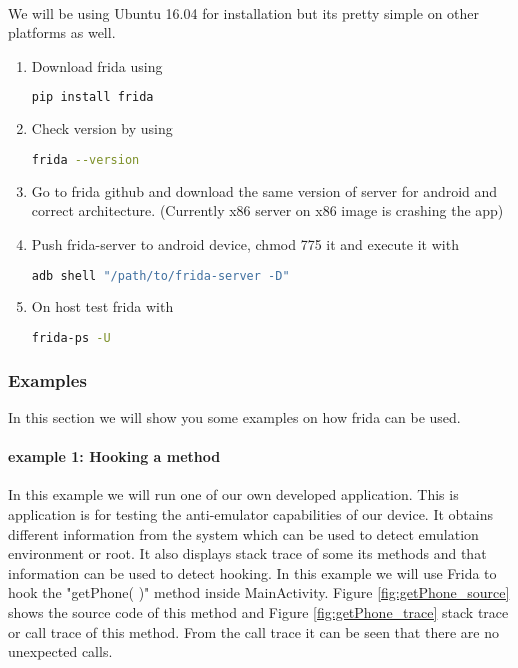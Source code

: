 \documentclass[../main.tex]{subfile}
\begin{document}
	\paragraph{} We will be using Ubuntu 16.04 for installation but its pretty simple on other platforms as well.
	\begin{enumerate}
		\item Download frida using
			\begin{lstlisting}[language=bash]
				pip install frida
			\end{lstlisting}
		
		\item Check version by using
			\begin{lstlisting}[language=bash]
				frida --version
			\end{lstlisting}
		\item Go to frida github and download the same version of server for android and correct architecture. (Currently x86 server on x86 image
		is crashing the app)
		\item Push frida-server to android device, chmod 775 it and execute it with
			\begin{lstlisting}[language=bash]
				adb shell "/path/to/frida-server -D"
			\end{lstlisting}
		\item On host test frida with
			\begin{lstlisting}[language=bash]
				frida-ps -U
			\end{lstlisting}
	\end{enumerate}

	\subsubsection{Examples}
	In this section we will show you some examples on how frida can be used.

	\paragraph{example 1: Hooking a method} In this example we will run one of our own developed application. This is application is for testing the anti-emulator capabilities of our device. It obtains different information from the system which can be used to detect emulation environment or root. It also displays stack trace of some its methods and that information can be used to detect hooking. In this example we will use Frida to hook the "getPhone( )" method inside MainActivity. Figure \ref{fig:getPhone_source} shows the source code of this method and Figure \ref{fig:getPhone_trace} stack trace or call trace of this method. From the call trace it can be seen that there are no unexpected calls.
	
\end{document}
